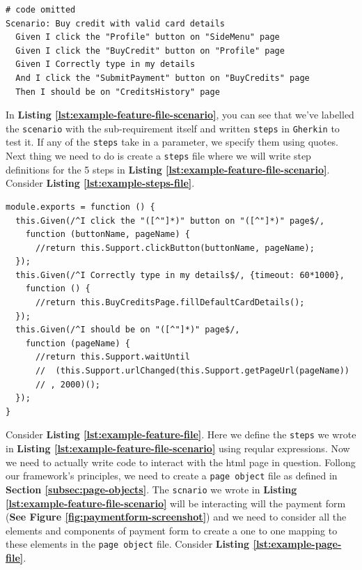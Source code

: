 \begin{listing}[H]
\begin{verbatim}
# code omitted
Scenario: Buy credit with valid card details
  Given I click the "Profile" button on "SideMenu" page
  Given I click the "BuyCredit" button on "Profile" page
  Given I Correctly type in my details
  And I click the "SubmitPayment" button on "BuyCredits" page
  Then I should be on "CreditsHistory" page
\end{verbatim}
\label{lst:example-feature-file-scenario}
\end{listing}

In \textbf{Listing \ref{lst:example-feature-file-scenario}}, you can see that we've labelled the \texttt{scenario} with the sub-requirement itself and written \texttt{steps} in \texttt{Gherkin} to test it. If any of the \texttt{steps} take in a parameter, we specify them using quotes.\\

Next thing we need to do is create a \texttt{steps} file where we will write step definitions for the 5 steps in \textbf{Listing \ref{lst:example-feature-file-scenario}}. Consider \textbf{Listing \ref{lst:example-steps-file}}.

\begin{listing}[H]
\begin{verbatim}
module.exports = function () {
  this.Given(/^I click the "([^"]*)" button on "([^"]*)" page$/,
    function (buttonName, pageName) {
      //return this.Support.clickButton(buttonName, pageName);
  });
  this.Given(/^I Correctly type in my details$/, {timeout: 60*1000},
    function () {
      //return this.BuyCreditsPage.fillDefaultCardDetails();
  });
  this.Given(/^I should be on "([^"]*)" page$/,
    function (pageName) {
      //return this.Support.waitUntil
      //  (this.Support.urlChanged(this.Support.getPageUrl(pageName))
      // , 2000)();
  });
}
\end{verbatim}
\label{lst:example-steps-file}
\end{listing}

Consider \textbf{Listing \ref{lst:example-feature-file}}. Here we define the \texttt{steps} we wrote in \textbf{Listing \ref{lst:example-feature-file-scenario}} using reqular expressions. Now we need to actually write code to interact with the html page in question. Follong our framework's principles, we  need to create a \texttt{page object} file as defined in \textbf{Section \ref{subsec:page-objects}}. The \texttt{scnario} we wrote in \textbf{Listing \ref{lst:example-feature-file-scenario}} will be interacting will the payment form (\textbf{See Figure \ref{fig:paymentform-screenshot}}) and we need to consider all the elements and components of payment form to create a one to one mapping to these elements in the \texttt{page object} file. Consider  \textbf{Listing \ref{lst:example-page-file}}.

